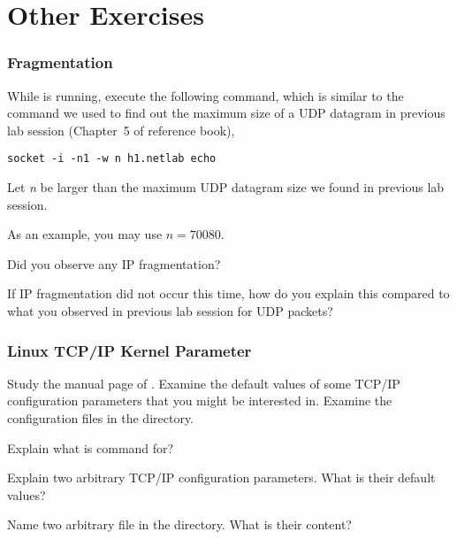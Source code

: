 \documentclass{../UTNetLab}
\begin{document}
\part{Other Exercises}
\section{Fragmentation}
    While  is running, execute the following command, which is similar to the command we used to find out the maximum size of a UDP datagram in previous lab session (Chapter~5 of reference book),
    \begin{lstlisting}[emph={n, h1,netlab}]
socket -i -n1 -w n h1.netlab echo
    \end{lstlisting}
    Let \textit{n} be larger than the maximum UDP datagram size we found in previous lab session.

    As an example, you may use $n = 70080$.

    \begin{report}
        \item Did you observe any IP fragmentation?
            
        \item If IP fragmentation did not occur this time, how do you explain this compared to what you observed in previous lab session for UDP packets?
    \end{report}

\section{Linux TCP/IP Kernel Parameter}
    Study the manual page of .
    Examine the default values of some TCP/IP configuration parameters that you might be interested in.
    Examine the configuration files in the  directory.

    \begin{report}
        \item Explain what is  command for?
            
        \item Explain two arbitrary TCP/IP configuration parameters.
                What is their default values?
            
        \item Name two arbitrary file in the  directory.
                What is their content?
    \end{report}
\end{document}
